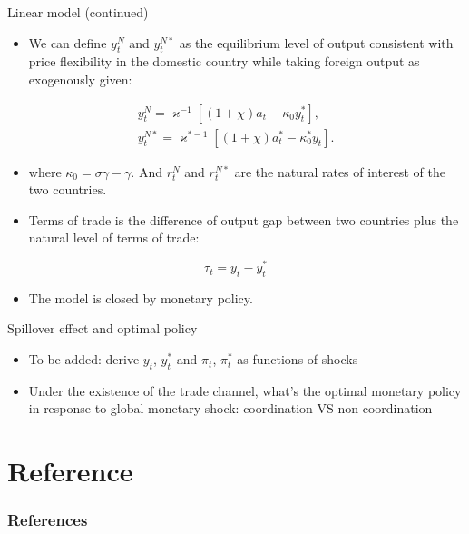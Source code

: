 \documentclass[10pt]{beamer}
\begin{document}
\begin{frame}{Linear model (continued)}

\begin{itemize}
    \item We can define $y_{t}^{N}$ and $y_{t}^{N *}$ as the equilibrium level of output consistent with price flexibility in the domestic country while taking foreign output as exogenously given:
\end{itemize}

$$
\begin{gathered}
y_{t}^{N}=\varkappa^{-1}\left[(1+\chi) a_{t}-\kappa_{0} y_{t}^{*}\right], \\
y_{t}^{N *}=\varkappa^{*-1}\left[(1+\chi) a_{t}^{*}-\kappa_{0}^{*} y_{t}\right] .
\end{gathered}
$$



\begin{itemize}
    \item where $\kappa_{0}=\sigma \gamma-\gamma$. And $r_{t}^{N}$ and $r_{t}^{N *}$ are the natural rates of interest of the two countries.
\end{itemize}

\begin{itemize}
    \item Terms of trade is the difference of output gap between two countries plus the natural level of terms of trade:
\end{itemize}


$$
\tau_{t}=y_{t}-y_{t}^{*}
$$
\begin{itemize}
    \item The model is closed by monetary policy.
\end{itemize}

\end{frame}


\begin{frame}{Spillover effect and optimal policy}

\begin{itemize}
    \item To be added: derive $y_t$, $y_t^*$ and $\pi_t$, $\pi_t^*$ as functions of shocks
    \item Under the existence of the trade channel, what's the optimal monetary policy in response to global monetary shock: coordination VS non-coordination
\end{itemize}

\end{frame}

\section*{Reference}

\begin{frame}[allowframebreaks]
	\frametitle{References}
	
	\footnotesize
	
\end{frame}
\end{document}
